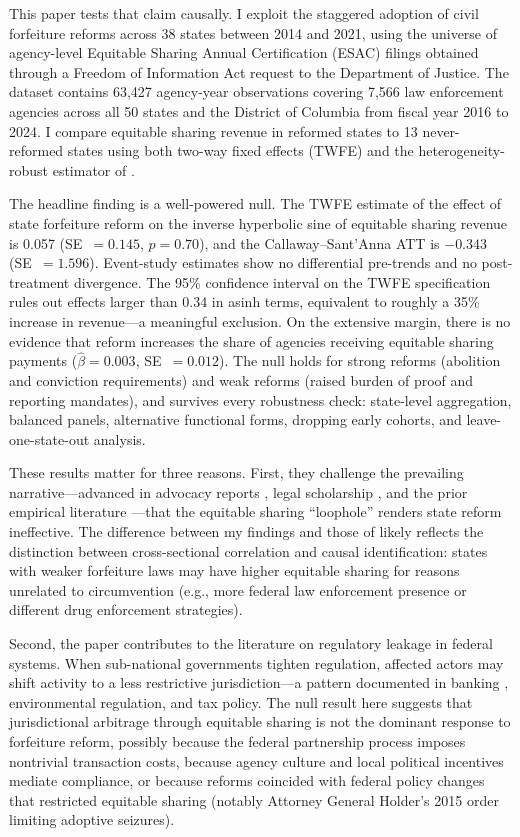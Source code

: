 \documentclass[12pt]{article}
\begin{document}
This paper tests that claim causally. I exploit the staggered adoption of civil forfeiture reforms across 38 states between 2014 and 2021, using the universe of agency-level Equitable Sharing Annual Certification (ESAC) filings obtained through a Freedom of Information Act request to the Department of Justice. The dataset contains 63,427 agency-year observations covering 7,566 law enforcement agencies across all 50 states and the District of Columbia from fiscal year 2016 to 2024. I compare equitable sharing revenue in reformed states to 13 never-reformed states using both two-way fixed effects (TWFE) and the heterogeneity-robust estimator of \citet{callaway2021difference}.

The headline finding is a well-powered null. The TWFE estimate of the effect of state forfeiture reform on the inverse hyperbolic sine of equitable sharing revenue is 0.057 (SE~$= 0.145$, $p = 0.70$), and the Callaway--Sant'Anna ATT is $-0.343$ (SE~$= 1.596$). Event-study estimates show no differential pre-trends and no post-treatment divergence. The 95\% confidence interval on the TWFE specification rules out effects larger than 0.34 in asinh terms, equivalent to roughly a 35\% increase in revenue---a meaningful exclusion. On the extensive margin, there is no evidence that reform increases the share of agencies receiving equitable sharing payments ($\hat{\beta} = 0.003$, SE~$= 0.012$). The null holds for strong reforms (abolition and conviction requirements) and weak reforms (raised burden of proof and reporting mandates), and survives every robustness check: state-level aggregation, balanced panels, alternative functional forms, dropping early cohorts, and leave-one-state-out analysis.

These results matter for three reasons. First, they challenge the prevailing narrative---advanced in advocacy reports \citep{ij2023policing}, legal scholarship \citep{carpenter2023generating, kelly2016policing}, and the prior empirical literature \citep{holcomb2011civil}---that the equitable sharing ``loophole'' renders state reform ineffective. The difference between my findings and those of \citet{holcomb2011civil} likely reflects the distinction between cross-sectional correlation and causal identification: states with weaker forfeiture laws may have higher equitable sharing for reasons unrelated to circumvention (e.g., more federal law enforcement presence or different drug enforcement strategies).

Second, the paper contributes to the literature on regulatory leakage in federal systems. When sub-national governments tighten regulation, affected actors may shift activity to a less restrictive jurisdiction---a pattern documented in banking \citep{makowsky2019law}, environmental regulation, and tax policy. The null result here suggests that jurisdictional arbitrage through equitable sharing is not the dominant response to forfeiture reform, possibly because the federal partnership process imposes nontrivial transaction costs, because agency culture and local political incentives mediate compliance, or because reforms coincided with federal policy changes that restricted equitable sharing (notably Attorney General Holder's 2015 order limiting adoptive seizures).
\end{document}

